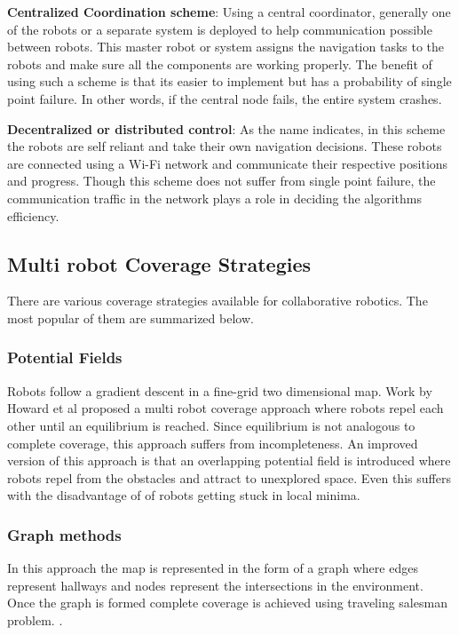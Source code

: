\noindent \textbf{Centralized Coordination scheme}:
Using a central coordinator, generally one of the robots or a separate system is deployed to help communication possible between robots. This master robot or system assigns the navigation tasks to the robots and make sure all the components are working properly. The benefit of using such a scheme is that its easier to implement but has a probability of single point failure. In other words, if the central node fails, the entire system crashes.

\noindent \textbf{Decentralized or distributed control}:
As the name indicates, in this scheme the robots are self reliant and take their own navigation decisions. These robots are connected using a Wi-Fi network and communicate their respective positions and progress. Though this scheme does not suffer from single point failure, the communication traffic in the network plays a role in deciding the algorithms efficiency.

\subsection{Multi robot Coverage Strategies}
There are various coverage strategies available for collaborative robotics. The most popular of them are summarized below\cite{43}. 

\subsubsection{Potential Fields}
Robots follow a gradient descent in a fine-grid two dimensional map. Work by Howard et al proposed a multi robot coverage approach where robots repel each other until an equilibrium is reached. Since equilibrium is not analogous to complete coverage, this approach suffers from incompleteness. An improved version of this approach is that an overlapping potential field is introduced where robots repel from the obstacles and attract to unexplored space. Even this suffers with the disadvantage of of robots getting stuck in local minima\cite{45}. 

\subsubsection{Graph methods}
In this approach the map is represented in the form of a graph where edges represent hallways and nodes represent the intersections in the environment. Once the graph is formed complete coverage is achieved using traveling salesman problem\cite{46}.  .

